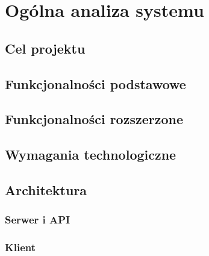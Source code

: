 \chapter{Ogólna analiza systemu}
\section{Cel projektu}
\section{Funkcjonalności podstawowe}
\section{Funkcjonalności rozszerzone}
\section{Wymagania technologiczne}
\section{Architektura}
	\subsection{Serwer i API}
	\subsection{Klient}

